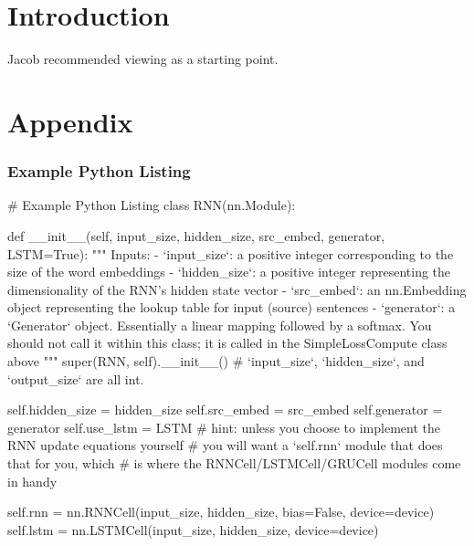 \chapter*{Introduction}

Jacob recommended viewing \cite{riscv} as a starting point.

\chapter*{Appendix}
\subsection*{Example Python Listing}
\begin{python}
    # Example Python Listing
    class RNN(nn.Module):

    def __init__(self, input_size, hidden_size, src_embed, generator, LSTM=True):
    """
    Inputs:
    - `input_size`: a positive integer corresponding to the size of the
    word embeddings
    - `hidden_size`: a positive integer representing the dimensionality of
    the RNN's hidden state vector
    - `src_embed`: an nn.Embedding object representing the lookup table for
    input (source) sentences
    - `generator`: a `Generator` object. Essentially a linear mapping
    followed by a softmax. You should not call it within this class; it
    is called in the SimpleLossCompute class above
    """
    super(RNN, self).__init__()
    # `input_size`, `hidden_size`, and `output_size` are all int.

    self.hidden_size = hidden_size
    self.src_embed = src_embed
    self.generator = generator
    self.use_lstm = LSTM
    # hint: unless you choose to implement the RNN update equations yourself
    #       you will want a `self.rnn` module that does that for you, which
    #       is where the RNNCell/LSTMCell/GRUCell modules come in handy

    self.rnn = nn.RNNCell(input_size, hidden_size, bias=False, device=device)
    self.lstm = nn.LSTMCell(input_size, hidden_size, device=device)
\end{python}
